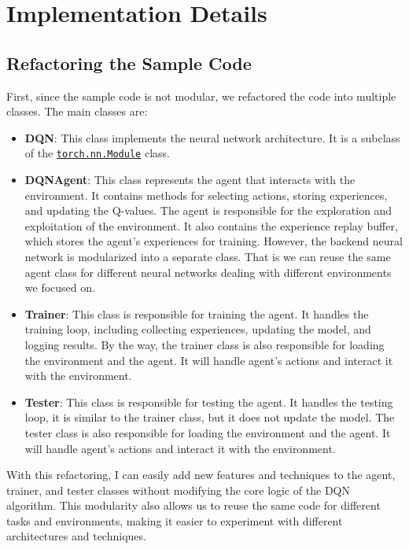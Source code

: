 \section{Implementation Details}
\label{sec:implementation}

\subsection{Refactoring the Sample Code}

First, since the sample code is not modular, we refactored the code into multiple classes. The main classes are:
\begin{itemize}
    \item \textbf{DQN}: This class implements the neural network architecture. It is a subclass of the \href{https://pytorch.org/docs/stable/generated/torch.nn.Module.html#torch.nn.Module}{\texttt{torch.nn.Module}} class.
    \item \textbf{DQNAgent}: This class represents the agent that interacts with the environment. It contains methods for selecting actions, storing experiences, and updating the Q-values.
          The agent is responsible for the exploration and exploitation of the environment.
          It also contains the experience replay buffer, which stores the agent's experiences for training.
          However, the backend neural network is modularized into a separate class. That is we can reuse the same agent class for different neural networks dealing with different environments we focused on.
    \item \textbf{Trainer}: This class is responsible for training the agent. It handles the training loop, including collecting experiences, updating the model, and logging results.
          By the way, the trainer class is also responsible for loading the environment and the agent. It will handle agent's actions and interact it with the environment.
    \item \textbf{Tester}: This class is responsible for testing the agent. It handles the testing loop, it is similar to the trainer class, but it does not update the model.
          The tester class is also responsible for loading the environment and the agent. It will handle agent's actions and interact it with the environment.
\end{itemize}

With this refactoring, I can easily add new features and techniques to the agent, trainer, and tester classes without modifying the core logic of the DQN algorithm.
This modularity also allows us to reuse the same code for different tasks and environments, making it easier to experiment with different architectures and techniques.

